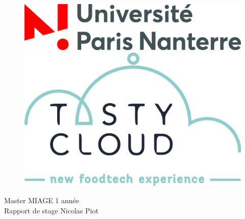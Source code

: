 \documentclass[oneside]{book}
\theoremstyle{break}
\begin{document}

\begin{titlepage}
\begin{center}

\begin{figure}[!tbp]
  \centering
  \begin{minipage}[b]{0.4\textwidth}
    \includegraphics[width=\textwidth]{parisnanterre.jpg}
  \end{minipage}
  \hfill
  \begin{minipage}[b]{0.4\textwidth}
    \includegraphics[width=\textwidth]{logo.png}
  \end{minipage}
\end{figure}

\noindent

{\large Master MIAGE 1 année}\\[0.5cm]

{\large Rapport de stage Nicolas Piot}\\[0.5cm]


\end{center}
\end{titlepage}
\end{document}
